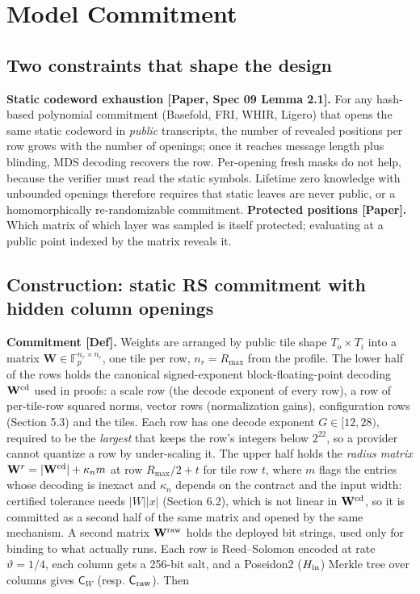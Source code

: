 \documentclass[10pt]{article}
\begin{document}
\section{Model Commitment}
\subsection{Two constraints that shape the design}
\textbf{Static codeword exhaustion [Paper, Spec 09 Lemma 2.1].} For any hash-based polynomial commitment (Basefold, FRI, WHIR, Ligero) that opens the same static codeword in \emph{public} transcripts, the number of revealed positions per row grows with the number of openings; once it reaches message length plus blinding, MDS decoding recovers the row. Per-opening fresh masks do not help, because the verifier must read the static symbols. Lifetime zero knowledge with unbounded openings therefore requires that static leaves are never public, or a homomorphically re-randomizable commitment. \textbf{Protected positions [Paper].} Which matrix of which layer was sampled is itself protected; evaluating at a public point indexed by the matrix reveals it.

\subsection{Construction: static RS commitment with hidden column openings}
\textbf{Commitment [Def].} Weights are arranged by public tile shape $T_o\times T_i$ into a matrix $\mathbf W\in\mathbb F_p^{n_r\times n_c}$, one tile per row, $n_r=R_{\max}$ from the profile. The lower half of the rows holds the canonical signed-exponent block-floating-point decoding $\mathbf W^{\rm cd}$ used in proofs: a scale row (the decode exponent of every row), a row of per-tile-row squared norms, vector rows (normalization gains), configuration rows (Section 5.3) and the tiles. Each row has one decode exponent $G\in[12,28)$, required to be the \emph{largest} that keeps the row's integers below $2^{22}$, so a provider cannot quantize a row by under-scaling it. The upper half holds the \emph{radius matrix} $\mathbf W^r=\lvert\mathbf W^{\rm cd}\rvert+\kappa_n m$ at row $R_{\max}/2+t$ for tile row $t$, where $m$ flags the entries whose decoding is inexact and $\kappa_n$ depends on the contract and the input width: certified tolerance needs $\lvert W\rvert\lvert x\rvert$ (Section 6.2), which is not linear in $\mathbf W^{\rm cd}$, so it is committed as a second half of the same matrix and opened by the same mechanism. A second matrix $\mathbf W^{\rm raw}$ holds the deployed bit strings, used only for binding to what actually runs. Each row is Reed--Solomon encoded at rate $\vartheta=1/4$, each column gets a 256-bit salt, and a Poseidon2 ($H_{\rm in}$) Merkle tree over columns gives $\mathsf C_W$ (resp. $\mathsf C_{\rm raw}$). Then
\end{document}

